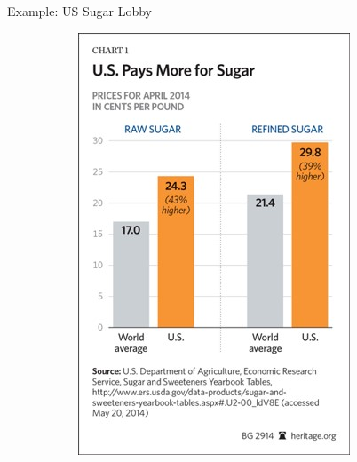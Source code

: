 \documentclass{beamer}
\begin{document}
\begin{frame}{\LARGE Example: US Sugar Lobby}
	\begin{figure}
		\centering
		\begin{subfigure}{0.49\textwidth}
			\centering
			\includegraphics[width = \textwidth,height=.9\textheight]{sugar1.jpg}
		\end{subfigure}
		\begin{subfigure}{0.49\textwidth}
			\centering

\end{subfigure}
\end{figure}
\end{frame}
\end{document}
